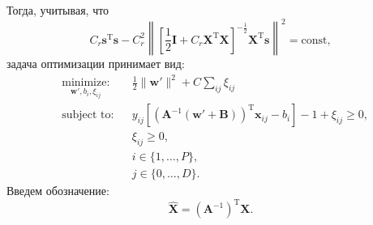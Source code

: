 \documentclass[12pt,twoside]{article}
\begin{document}
Тогда, учитывая, что 
\begin{equation*}
C_r\mathbf{s}^{\text{T}}\mathbf{s}-
C_r^2\left\|\left[\frac{1}{2}\mathbf{I} + C_{r}{\mathbf{X}}^{\text{T}}{\mathbf{X}}\right]^{-\frac12}
{\mathbf{X}}^{\text{T}}\mathbf{s}\right\|^2
=\text{const},
\end{equation*}
задача оптимизации принимает вид: 
\begin{equation}\label{eq17}
\begin{aligned}
& \underset{\mathbf{w}', b_i, \xi_{ij}}{\text{minimize:}}
& & \frac{1}{2} \|\mathbf{w}'\|^2 + C\sum\limits_{ij}\xi_{ij} \\
& \text{subject to:}
& & y_{ij}[\left(\mathbf{A}^{-1}\left(\mathbf{w}'+\mathbf{B}\right)\right)^{\text{T}}\mathbf{x}_{ij} - b_i]-1+\xi_{ij} \geq 0, \\
&&& \xi_{ij} \geq 0, \\
&&&i\in\{1,\dots,P\}, \\
&&&j\in\{0,\dots,D\}.
\end{aligned}
\end{equation}
Введем обозначение:
\begin{equation}\label{eq18}
\hat{\mathbf{X}} = (\mathbf{A}^{-1})^{\text{T}}\mathbf{X}.
\end{equation}
\end{document}
